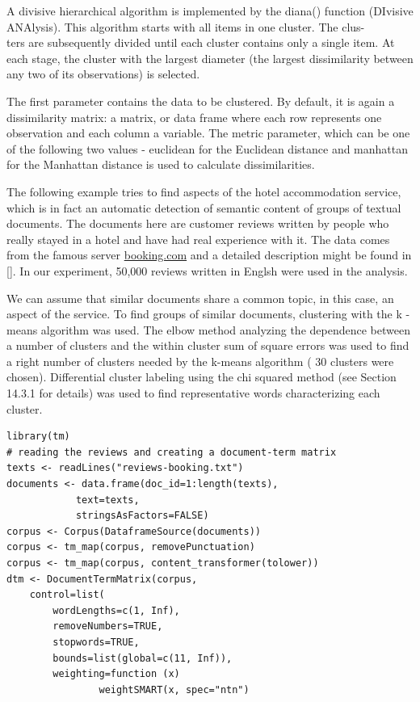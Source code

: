 A divisive hierarchical algorithm is implemented by the diana() function (DIvisive ANAlysis). This algorithm starts with all items in one cluster. The clus-\\
ters are subsequently divided until each cluster contains only a single item. At each stage, the cluster with the largest diameter (the largest dissimilarity between any two of its observations) is selected.

The first parameter contains the data to be clustered. By default, it is again a dissimilarity matrix: a matrix, or data frame where each row represents one observation and each column a variable. The metric parameter, which can be one of the following two values - euclidean for the Euclidean distance and manhattan for the Manhattan distance is used to calculate dissimilarities.

The following example tries to find aspects of the hotel accommodation service, which is in fact an automatic detection of semantic content of groups of textual documents. The documents here are customer reviews written by people who really stayed in a hotel and have had real experience with it. The data comes from the famous server \href{http://booking.com}{booking.com} and a detailed description might be found in [\cite{ref295}]. In our experiment, 50,000 reviews written in Englsh were used in the analysis.

We can assume that similar documents share a common topic, in this case, an aspect of the service. To find groups of similar documents, clustering with the k -means algorithm was used. The elbow method analyzing the dependence between a number of clusters and the within cluster sum of square errors was used to find a right number of clusters needed by the k-means algorithm ( 30 clusters were chosen). Differential cluster labeling using the chi squared method (see Section 14.3.1 for details) was used to find representative words characterizing each cluster.

\begin{verbatim}
library(tm)
# reading the reviews and creating a document-term matrix
texts <- readLines("reviews-booking.txt")
documents <- data.frame(doc_id=1:length(texts),
            text=texts,
            stringsAsFactors=FALSE)
corpus <- Corpus(DataframeSource(documents))
corpus <- tm_map(corpus, removePunctuation)
corpus <- tm_map(corpus, content_transformer(tolower))
dtm <- DocumentTermMatrix(corpus,
    control=list(
        wordLengths=c(1, Inf),
        removeNumbers=TRUE,
        stopwords=TRUE,
        bounds=list(global=c(11, Inf)),
        weighting=function (x)
                weightSMART(x, spec="ntn")
\end{verbatim}

